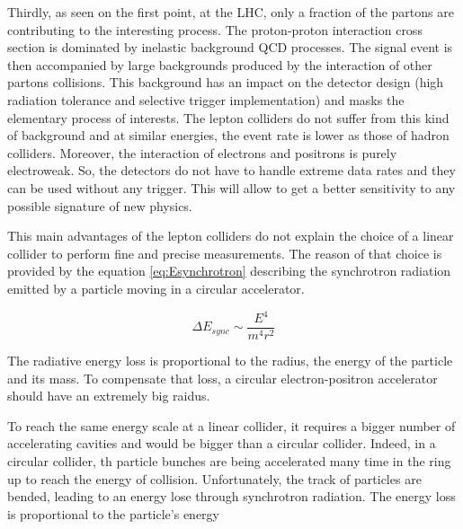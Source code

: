     Thirdly, as seen on the first point, at the \gls{LHC}, only a fraction of the partons are contributing to the interesting process. 
    The proton-proton interaction cross section is dominated by inelastic background QCD processes.
    The signal event is then accompanied by large backgrounds produced by the interaction of other partons collisions.
    This background has an impact on the detector design (high radiation tolerance and selective trigger implementation) and masks the elementary process of interests. 
    The lepton colliders do not suffer from this kind of background and at similar energies, the event rate is lower as those of hadron colliders.
    Moreover, the interaction of electrons and positrons is purely electroweak.
    So, the detectors do not have to handle extreme data rates and they can be used without any trigger.
    This will allow to get a better sensitivity to any possible signature of new physics.

    This main advantages of the lepton colliders do not explain the choice of a linear collider to perform fine and precise measurements.
    The reason of that choice is provided by the equation \ref{eq:Esynchrotron} describing the synchrotron radiation emitted by a particle moving in a circular accelerator.
    
    \begin{equation}
     \Delta E_{sync} \sim \frac{E^4}{m^4r^2}
       \label{eq:Esynchrotron}
    \end{equation} 

    The radiative energy loss is proportional to the radius, the energy of the particle and its mass.
    To compensate that loss, a circular electron-positron accelerator should have an extremely big raidus. 



    To reach the same energy scale at a linear collider, it requires a bigger number of accelerating cavities and would be bigger than a circular collider.
    Indeed, in a circular collider, th particle bunches are being accelerated many time in the ring up to reach the energy of collision.
    Unfortunately, the track of particles are bended, leading to an energy lose through synchrotron radiation.
    The energy loss is proportional to the particle's energy
    

    
